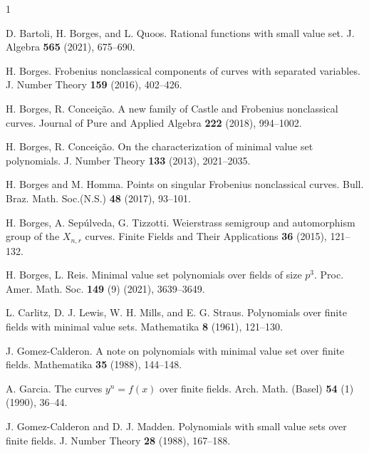 \documentclass[11pt]{amsart}
\theoremstyle{definition}
\theoremstyle{remark}
\begin{document}
\begin{thebibliography}{1}

 D. Bartoli, H. Borges, and L. Quoos.
\newblock Rational functions with small value set.
\newblock J. Algebra {\bf 565} (2021), 675--690.


 H. Borges.
\newblock Frobenius nonclassical components of curves with separated  variables.
\newblock   J. Number Theory {\bf 159} (2016), 402--426.


 H. Borges, R.  Concei\c c\~ao.
\newblock A new family of Castle and Frobenius nonclassical curves.
\newblock  Journal of Pure and Applied Algebra {\bf 222} (2018),  994--1002.





 H. Borges, R.  Concei\c c\~ao.
\newblock On the characterization of minimal value set polynomials.
\newblock J. Number Theory {\bf 133} (2013), 2021--2035.


 H. Borges and M. Homma.
\newblock Points on singular Frobenius nonclassical curves.
\newblock Bull. Braz. Math. Soc.(N.S.) {\bf 48} (2017), 93--101.


H. Borges,  A. Sep\'ulveda,  G. Tizzotti.
\newblock Weierstrass semigroup and automorphism group of the $X_{n,r}$ curves.
\newblock Finite Fields and Their Applications {\bf 36} (2015), 121--132.

 H. Borges, L. Reis.
\newblock Minimal value set polynomials over fields of size $p^3$.
\newblock Proc. Amer. Math. Soc. {\bf 149} (9) (2021), 3639--3649.

 

 L. Carlitz, D. J. Lewis, W. H. Mills, and E. G. Straus. 
\newblock Polynomials over finite fields  with minimal value sets.
\newblock Mathematika {\bf 8} (1961), 121--130.



 J. Gomez-Calderon. 
\newblock A note on polynomials with minimal value set over finite fields.
\newblock  Mathematika {\bf 35} (1988), 144--148.



 A. Garcia.
\newblock The curves  $y^n=f(x)$ over finite fields.
\newblock  Arch. Math. (Basel) {\bf 54} (1) (1990), 36--44.

 J. Gomez-Calderon and  D. J.  Madden.
\newblock Polynomials with small value sets over finite fields.
\newblock  J. Number Theory {\bf 28} (1988), 167--188.





\end{thebibliography}
\end{document}
